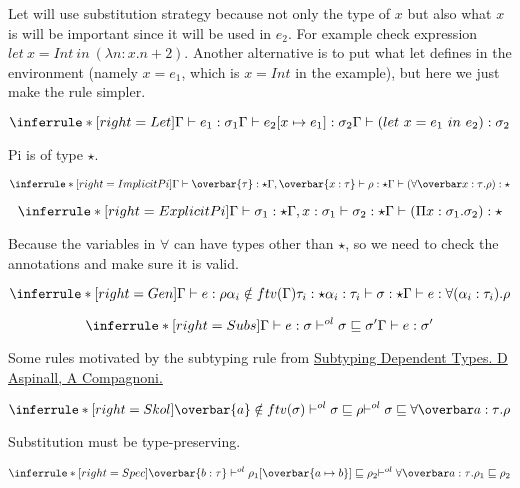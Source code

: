 Let will use substitution strategy because not only the type of $x$ but also what $x$ is will be important since it will be used in $e_2$. For example check expression $let\ x = Int\ in\ (\lambda n:x.n + 2)$. Another alternative is to put what let defines in the environment (namely $x=e_1$, which is $x=Int$ in the example), but here we just make the rule simpler.

\[
\inferrule*[right=Let]
{\judge e_1 : \sigma_1 \\ \Gamma \vdash e_2[\tpmapsto {\sigma_1} x {e_1}]: \sigma_2} {\judge ( let\ x = e_1\ in\ e_2 ) : \sigma_2 }
\]

Pi is of type $\star$.

\[
\inferrule*[right=ImplicitPi]
{\judge \overbar{\tau} : \star \\ \Gamma, \overbar{x:\tau} \vdash \rho : \star} {\judge (\forallvars{x : \tau}. \rho) : \star}
\]

\[
\inferrule*[right=ExplicitPi]
{\judge \sigma_1 : \star \\ \Gamma, x:\sigma_1 \vdash \sigma_2 : \star} {\judge (\Pi x:\sigma_1. \sigma_2) : \star}
\]

Because the variables in $\forall$ can have types other than $\star$, so we need to check the annotations and make sure it is valid.

\[
\inferrule*[right=Gen]
{\judge e : \rho \\
\alpha_i \notin ftv(\Gamma) \\
\tau_i : \star \\
\alpha_i : \tau_i \vdash \sigma : \star}
{\judge e : \forall(\alpha_i : \tau_i). \rho }
\]

\[
\inferrule*[right=Subs]
{\judge e : \sigma \\ \olpolymorphic{\sigma} {\sigma'}} {\judge e : \sigma' }
\]


Some rules motivated by the subtyping rule from \href{http://citeseerx.ist.psu.edu/viewdoc/download?doi=10.1.1.52.5145&rep=rep1&type=pdf}{Subtyping Dependent Types. D Aspinall, A Compagnoni. }

\[
\inferrule*[right=Skol]
{
\overbar{a} \notin ftv(\sigma)\\
\olpolymorphic \sigma \rho \\
}
{\olpolymorphic \sigma {\forallvars{a:\tau}.\rho}}
\]

Substitution must be type-preserving.

\[
\inferrule*[right=Spec]
{\overbar{b: \tau} \\
\olpolymorphic {\rho_1[\overbar{\tpmapsto \tau a b}]} {\rho_2}}
{\olpolymorphic {\forallvars{a:\tau}.\rho_1} {\rho_2}}
\]

